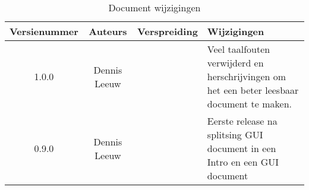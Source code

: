 \begin{flushleft}
\begin{table}[h!]
\centering
\begin{tabularx}{\textwidth}{ |c|c|c|X| }
\hline
	Versienummer &
	Auteurs &
	Verspreiding &
	Wijzigingen\\
\hline
	1.0.0 &
	Dennis Leeuw &
	&
	Veel taalfouten verwijderd en herschrijvingen om het een beter leesbaar document te maken.\\
\hline
	0.9.0 &
	Dennis Leeuw &
	&
	Eerste release na splitsing GUI document in een Intro en een GUI document\\
\hline
\end{tabularx}
\caption{Document wijzigingen}
\label{table:1}
\end{table}
\end{flushleft}


